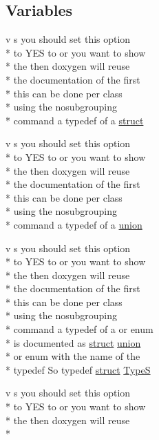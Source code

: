 \subsection*{Variables}
\begin{DoxyCompactItemize}
\item 
v s you should set this option \\*
to Y\-E\-S to or you want to show \\*
the then doxygen will reuse \\*
the documentation of the first \\*
this can be done per class \\*
using the nosubgrouping \\*
command a typedef of a \hyperlink{mkdoc_8dox_aba655c5729da86df745f0c8e7f9ba8d2}{struct}
\item 
v s you should set this option \\*
to Y\-E\-S to or you want to show \\*
the then doxygen will reuse \\*
the documentation of the first \\*
this can be done per class \\*
using the nosubgrouping \\*
command a typedef of a \hyperlink{mkdoc_8dox_a68000add3c95d09ceb97c3079515907d}{union}
\item 
v s you should set this option \\*
to Y\-E\-S to or you want to show \\*
the then doxygen will reuse \\*
the documentation of the first \\*
this can be done per class \\*
using the nosubgrouping \\*
command a typedef of a or enum \\*
is documented as \hyperlink{mkdoc_8dox_aba655c5729da86df745f0c8e7f9ba8d2}{struct} \hyperlink{mkdoc_8dox_a68000add3c95d09ceb97c3079515907d}{union} \\*
or enum with the name of the \\*
typedef So typedef \hyperlink{mkdoc_8dox_aba655c5729da86df745f0c8e7f9ba8d2}{struct} \hyperlink{mkdoc_8dox_a25dd1c015abaf1e4f2c6879012f4f170}{Type\-S}
\item 
v s you should set this option \\*
to Y\-E\-S to or you want to show \\*
the then doxygen will reuse \\*

\end{DoxyCompactItemize}

